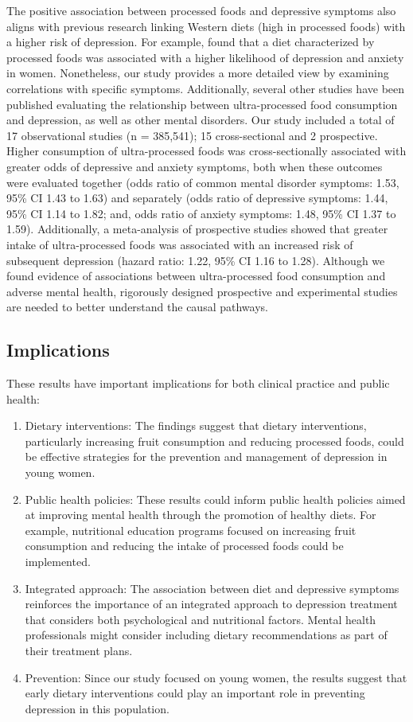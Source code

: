 \documentclass[jou]{apa7}
\begin{document}
The positive association between processed foods and depressive symptoms also aligns with previous research linking Western diets (high in processed foods) with a higher risk of depression. For example, \parencite{laneUltraProcessedFoodConsumption2022} found that a diet characterized by processed foods was associated with a higher likelihood of depression and anxiety in women. Nonetheless, our study provides a more detailed view by examining correlations with specific symptoms. Additionally, several other studies have been published evaluating the relationship between ultra-processed food consumption and depression, as well as other mental disorders. Our study included a total of 17 observational studies (n = 385,541); 15 cross-sectional and 2 prospective. Higher consumption of ultra-processed foods was cross-sectionally associated with greater odds of depressive and anxiety symptoms, both when these outcomes were evaluated together (odds ratio of common mental disorder symptoms: 1.53, 95\% CI 1.43 to 1.63) and separately (odds ratio of depressive symptoms: 1.44, 95\% CI 1.14 to 1.82; and, odds ratio of anxiety symptoms: 1.48, 95\% CI 1.37 to 1.59). Additionally, a meta-analysis of prospective studies showed that greater intake of ultra-processed foods was associated with an increased risk of subsequent depression (hazard ratio: 1.22, 95\% CI 1.16 to 1.28). Although we found evidence of associations between ultra-processed food consumption and adverse mental health, rigorously designed prospective and experimental studies are needed to better understand the causal pathways.

\subsection{Implications}\label{implicaciones}

These results have important implications for both clinical practice and public health:

\begin{enumerate}
	\item Dietary interventions: The findings suggest that dietary interventions, particularly increasing fruit consumption and reducing processed foods, could be effective strategies for the prevention and management of depression in young women.
	\item Public health policies: These results could inform public health policies aimed at improving mental health through the promotion of healthy diets. For example, nutritional education programs focused on increasing fruit consumption and reducing the intake of processed foods could be implemented.
	\item Integrated approach: The association between diet and depressive symptoms reinforces the importance of an integrated approach to depression treatment that considers both psychological and nutritional factors. Mental health professionals might consider including dietary recommendations as part of their treatment plans.
	\item Prevention: Since our study focused on young women, the results suggest that early dietary interventions could play an important role in preventing depression in this population.
\end{enumerate}
\end{document}
